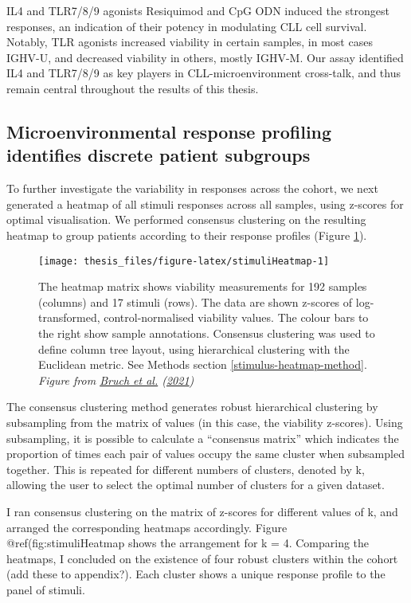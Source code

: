 \documentclass[11pt, a4paper, twosided]{book}
\begin{document}
IL4 and TLR7/8/9 agonists Resiquimod and CpG ODN induced the strongest responses, an indication of their potency in modulating CLL cell survival. Notably, TLR agonists increased viability in certain samples, in most cases IGHV-U, and decreased viability in others, mostly IGHV-M. Our assay identified IL4 and TLR7/8/9 as key players in CLL-microenvironment cross-talk, and thus remain central throughout the results of this thesis.

\hypertarget{clusters}{%
\subsection{Microenvironmental response profiling identifies discrete patient subgroups}\label{clusters}}

To further investigate the variability in responses across the cohort, we next generated a heatmap of all stimuli responses across all samples, using z-scores for optimal visualisation. We performed consensus clustering on the resulting heatmap to group patients according to their response profiles (Figure \ref{fig:stimuliHeatmap}).


\begin{figure}

{\centering \texttt{[image: thesis\_files/figure-latex/stimuliHeatmap-1]} 

}

\caption{The heatmap matrix shows viability measurements for 192 samples (columns) and 17 stimuli (rows). The data are shown z-scores of log-transformed, control-normalised viability values. The colour bars to the right show sample annotations. Consensus clustering was used to define column tree layout, using hierarchical clustering with the Euclidean metric. See Methods section \ref{stimulus-heatmap-method}. \emph{Figure from \protect\hyperlink{ref-Giles2021}{Bruch et al.} (\protect\hyperlink{ref-Giles2021}{2021}) }}\label{fig:stimuliHeatmap}
\end{figure}
The consensus clustering method generates robust hierarchical clustering by subsampling from the matrix of values (in this case, the viability z-scores). Using subsampling, it is possible to calculate a ``consensus matrix'' which indicates the proportion of times each pair of values occupy the same cluster when subsampled together. This is repeated for different numbers of clusters, denoted by k, allowing the user to select the optimal number of clusters for a given dataset.

I ran consensus clustering on the matrix of z-scores for different values of k, and arranged the corresponding heatmaps accordingly. Figure @ref(fig:stimuliHeatmap shows the arrangement for k = 4. Comparing the heatmaps, I concluded on the existence of four robust clusters within the cohort (add these to appendix?). Each cluster shows a unique response profile to the panel of stimuli.
\end{document}
